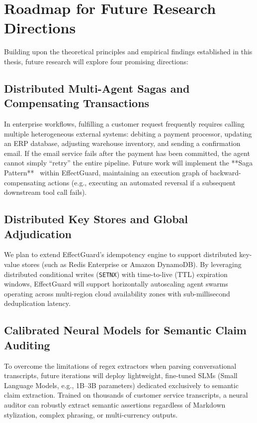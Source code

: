 \section{Roadmap for Future Research Directions}
\label{sec:concl_future}
Building upon the theoretical principles and empirical findings established in this thesis, future research will explore four promising directions:

\subsection{Distributed Multi-Agent Sagas and Compensating Transactions}
In enterprise workflows, fulfilling a customer request frequently requires calling multiple heterogeneous external systems: debiting a payment processor, updating an ERP database, adjusting warehouse inventory, and sending a confirmation email. If the email service fails after the payment has been committed, the agent cannot simply ``retry'' the entire pipeline. Future work will implement the **Saga Pattern**~\cite{garciamolina1987sagas} within EffectGuard, maintaining an execution graph of backward-compensating actions (e.g., executing an automated reversal if a subsequent downstream tool call fails).

\subsection{Distributed Key Stores and Global Adjudication}
We plan to extend EffectGuard's idempotency engine to support distributed key-value stores (such as Redis Enterprise or Amazon DynamoDB). By leveraging distributed conditional writes (\texttt{SETNX}) with time-to-live (TTL) expiration windows, EffectGuard will support horizontally autoscaling agent swarms operating across multi-region cloud availability zones with sub-millisecond deduplication latency.

\subsection{Calibrated Neural Models for Semantic Claim Auditing}
To overcome the limitations of regex extractors when parsing conversational transcripts, future iterations will deploy lightweight, fine-tuned SLMs (Small Language Models, e.g., 1B--3B parameters) dedicated exclusively to semantic claim extraction. Trained on thousands of customer service transcripts, a neural auditor can robustly extract semantic assertions regardless of Markdown stylization, complex phrasing, or multi-currency outputs.


